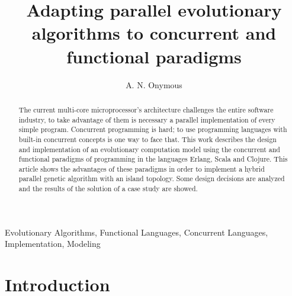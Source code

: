 \documentclass[a4paper]{llncs}
\newcommand{\keywords}[1]{\par\addvspace\baselineskip
\noindent\keywordname\enspace\ignorespaces#1}
\begin{document}
\title{Adapting parallel evolutionary algorithms to concurrent and functional paradigms}

\author{A. N. Onymous}






\maketitle

\begin{abstract}
The current multi-core microprocessor's architecture challenges the entire software industry, to take advantage of them is necessary a parallel implementation of every simple program. Concurrent programming is hard; to use programming languages with built-in concurrent concepts is one way to face that. This work describes the design and implementation of an evolutionary computation model using the concurrent and functional paradigms of programming in the languages Erlang, Scala and Clojure. This article shows the advantages of these paradigms in order to implement a hybrid parallel genetic algorithm with an island topology. Some design decisions are analyzed and the results of the solution of a case study are showed.
\end{abstract}


\keywords{Evolutionary Algorithms, Functional Languages, Concurrent Languages, Implementation, Modeling}


\section{Introduction}
\label{sec:intro}
    
\end{document}
